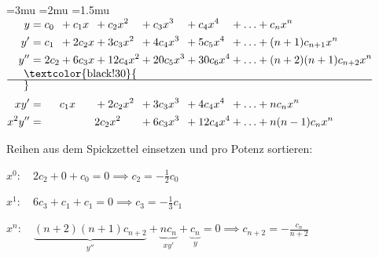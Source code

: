 \begin{formulabox}
    \footnotesize
    \thickmuskip=3mu
    \medmuskip=2mu
    \thinmuskip=1.5mu
    $\begin{alignedat}{8}
        y      &= c_0  &&{}+ c_1 x   &&{}+ c_2 x^2   &&{}+ c_3 x^3   &&{}+ c_4 x^4   &&{}+ \dots &&{}+ c_n x^n \\
        y'     &= c_1  &&{}+ 2c_2 x  &&{}+ 3c_3 x^2  &&{}+ 4c_4 x^3  &&{}+ 5c_5 x^4  &&{}+ \dots &&{}+ (n+1)c_{n+1} x^n \\
        y''    &= 2c_2 &&{}+ 6c_3 x  &&{}+ 12c_4 x^2 &&{}+ 20c_5 x^3 &&{}+ 30c_6 x^4 &&{}+ \dots &&{}+ (n+2)(n+1)c_{n+2} x^n \\
        \noalign{\vskip-2.5pt\textcolor{black!30}{\hrule height 0.5pt}\vskip2.5pt}
        x y'   &=      &&   c_1 x   &&{}+ 2c_2 x^2  &&{}+ 3c_3 x^3  &&{}+ 4c_4 x^4  &&{}+ \dots &&{}+ n c_n x^n \\
        x^2 y''&=      &&           &&   2c_2 x^2  &&{}+ 6c_3 x^3  &&{}+ 12c_4 x^4 &&{}+ \dots &&{}+ n(n-1)c_n x^n
    \end{alignedat}$
\end{formulabox}

\begin{statementbox}[Beispiel Koeffizientenvergleich: $y'' + x y' + y = 0$]
    Reihen aus dem Spickzettel einsetzen und pro Potenz sortieren:\par
    $x^0: \quad 2c_2 + 0 + c_0 = 0 \implies c_2 = -\frac{1}{2} c_0$\par
    $x^1: \quad 6c_3 + c_1 + c_1 = 0 \implies c_3 = -\frac{1}{3} c_1$\par
    $x^n: \quad \underbrace{(n+2)(n+1)c_{n+2}}_{y''} + \underbrace{n c_n}_{x y'} + \underbrace{c_n}_{y} = 0 \implies c_{n+2} = -\frac{c_n}{n+2}$
\end{statementbox}
